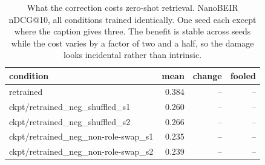\begin{table}[t]
\centering
\small
\caption{What the correction costs zero-shot retrieval. NanoBEIR nDCG@10, all conditions trained identically. One seed each except where the caption gives three. The benefit is stable across seeds while the cost varies by a factor of two and a half, so the damage looks incidental rather than intrinsic.}
\begin{tabular}{lrrr}
\toprule
condition & mean & change & fooled \\
\midrule
retrained & 0.384 & -- & -- \\
ckpt/retrained\_neg\_shuffled\_s1 & 0.260 & -- & -- \\
ckpt/retrained\_neg\_shuffled\_s2 & 0.266 & -- & -- \\
ckpt/retrained\_neg\_non-role-swap\_s1 & 0.235 & -- & -- \\
ckpt/retrained\_neg\_non-role-swap\_s2 & 0.239 & -- & -- \\
\bottomrule
\end{tabular}
\end{table}
